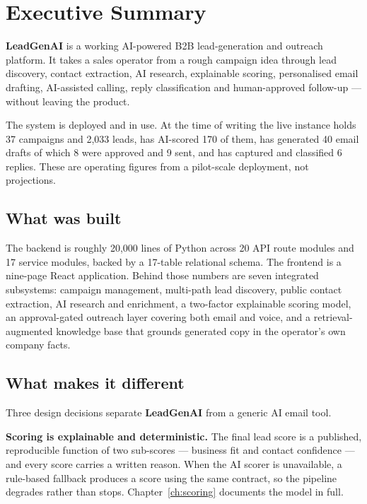 \documentclass[11pt,a4paper]{report}
\newcommand{\footcontent}{\thepage}
\newcommand{\project}{\textbf{LeadGenAI}}
\begin{document}
\tableofcontents
\listoffigures
\listoftables
\clearpage
{}
\renewcommand{\footcontent}{Page \thepage\ of \pageref{LastPage}}

\chapter{Executive Summary}
\project{} is a working AI-powered B2B lead-generation and outreach platform. It takes a sales operator from a rough campaign idea through lead discovery, contact extraction, AI research, explainable scoring, personalised email drafting, AI-assisted calling, reply classification and human-approved follow-up --- without leaving the product.

The system is deployed and in use. At the time of writing the live instance holds 37 campaigns and 2{,}033 leads, has AI-scored 170 of them, has generated 40 email drafts of which 8 were approved and 9 sent, and has captured and classified 6 replies. These are operating figures from a pilot-scale deployment, not projections.

\section{What was built}
The backend is roughly 20{,}000 lines of Python across 20 API route modules and 17 service modules, backed by a 17-table relational schema. The frontend is a nine-page React application. Behind those numbers are seven integrated subsystems: campaign management, multi-path lead discovery, public contact extraction, AI research and enrichment, a two-factor explainable scoring model, an approval-gated outreach layer covering both email and voice, and a retrieval-augmented knowledge base that grounds generated copy in the operator's own company facts.

\section{What makes it different}
Three design decisions separate \project{} from a generic AI email tool.

\textbf{Scoring is explainable and deterministic.} The final lead score is a published, reproducible function of two sub-scores --- business fit and contact confidence --- and every score carries a written reason. When the AI scorer is unavailable, a rule-based fallback produces a score using the same contract, so the pipeline degrades rather than stops. Chapter~\ref{ch:scoring} documents the model in full.
\end{document}
